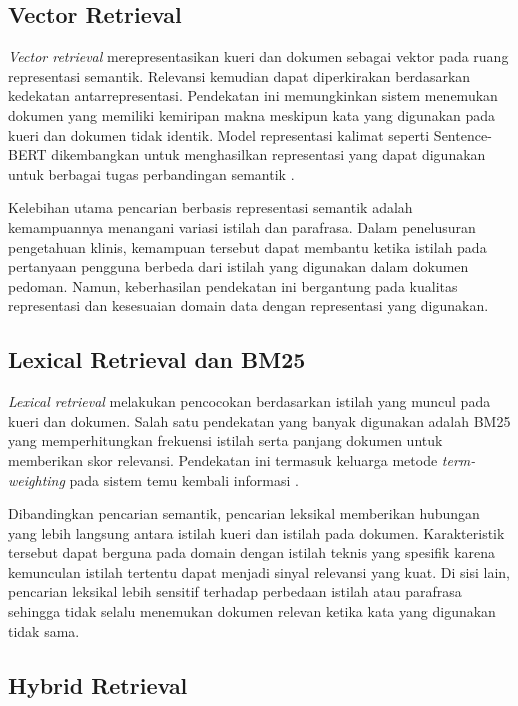 \subsection{Vector Retrieval}
\label{subsec:bab2-vector-retrieval}

\textit{Vector retrieval} merepresentasikan kueri dan dokumen sebagai vektor pada ruang representasi semantik. Relevansi kemudian dapat diperkirakan berdasarkan kedekatan
antarrepresentasi. Pendekatan ini memungkinkan sistem menemukan dokumen yang memiliki kemiripan makna meskipun kata yang digunakan pada kueri dan dokumen tidak identik. Model
representasi kalimat seperti Sentence-BERT dikembangkan untuk menghasilkan representasi yang dapat digunakan untuk berbagai tugas perbandingan semantik
\parencite{reimers2019}.

Kelebihan utama pencarian berbasis representasi semantik adalah kemampuannya menangani variasi istilah dan parafrasa. Dalam penelusuran pengetahuan klinis, kemampuan tersebut
dapat membantu ketika istilah pada pertanyaan pengguna berbeda dari istilah yang digunakan dalam dokumen pedoman. Namun, keberhasilan pendekatan ini bergantung pada kualitas
representasi dan kesesuaian domain data dengan representasi yang digunakan.

\subsection{Lexical Retrieval dan BM25}
\label{subsec:bab2-lexical-retrieval}

\textit{Lexical retrieval} melakukan pencocokan berdasarkan istilah yang muncul pada kueri dan dokumen. Salah satu pendekatan yang banyak digunakan adalah BM25 yang
memperhitungkan frekuensi istilah serta panjang dokumen untuk memberikan skor relevansi. Pendekatan ini termasuk keluarga metode \textit{term-weighting} pada sistem temu
kembali informasi \parencite{manning2008}.

Dibandingkan pencarian semantik, pencarian leksikal memberikan hubungan yang lebih langsung antara istilah kueri dan istilah pada dokumen. Karakteristik tersebut dapat berguna
pada domain dengan istilah teknis yang spesifik karena kemunculan istilah tertentu dapat menjadi sinyal relevansi yang kuat. Di sisi lain, pencarian leksikal lebih sensitif
terhadap perbedaan istilah atau parafrasa sehingga tidak selalu menemukan dokumen relevan ketika kata yang digunakan tidak sama.

\subsection{Hybrid Retrieval}
\label{subsec:bab2-hybrid-retrieval}

